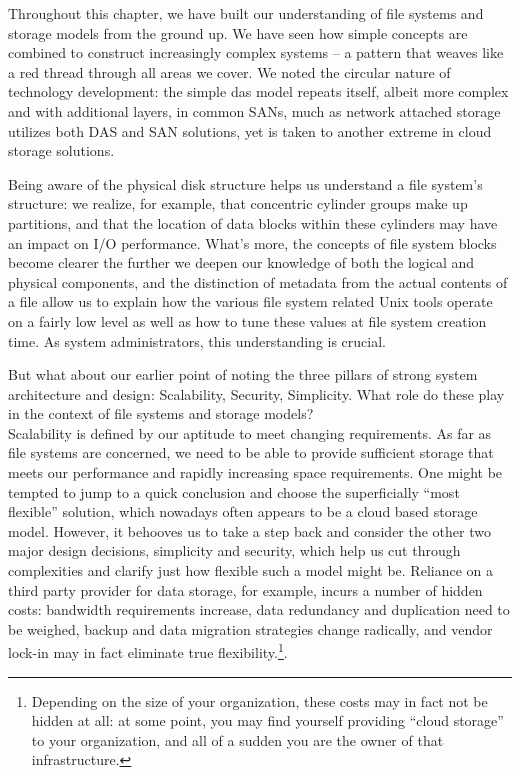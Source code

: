 Throughout this chapter, we have built our
understanding of file systems and storage models from
the ground up.  We have seen how simple concepts are
combined to construct increasingly complex systems --
a pattern that weaves like a red thread through all
areas we cover.  We noted the circular nature of
technology development: the simple \gls{das} model
repeats itself, albeit more complex and with
additional layers, in common SANs, much as network
attached storage utilizes both DAS and SAN solutions,
yet is taken to another extreme in cloud storage
solutions.

Being aware of the physical disk structure helps us
understand a file system's structure: we realize, for
example, that concentric cylinder groups make up
partitions, and that the location of data blocks
within these cylinders may have an impact on I/O
performance.  What's more, the concepts of file system
blocks become clearer the further we deepen our
knowledge of both the logical and physical components,
and the distinction of metadata from the actual
contents of a file allow us to explain how the various
file system related Unix tools operate on a fairly low
level as well as how to tune these values at file
system creation time.  As system administrators, this
understanding is crucial.

But what about our earlier point of noting the three
pillars of strong system architecture and design:
Scalability, Security, Simplicity.  What role do these
play in the context of file systems and storage
models? \\

Scalability is defined by our aptitude to meet
changing requirements.  As far as file systems are
concerned, we need to be able to provide sufficient
storage that meets our performance and rapidly
increasing space requirements.  One might be tempted
to jump to a quick conclusion and choose the
superficially ``most flexible'' solution, which
nowadays often appears to be a cloud based storage
model.  However, it behooves us to take a step back
and consider the other two major design decisions,
simplicity and security, which help us cut through
complexities and clarify just how flexible such a
model might be.  Reliance on a third party provider
for data storage, for example, incurs a number of
hidden costs: bandwidth requirements increase, data
redundancy and duplication need to be weighed, backup
and data migration strategies change radically, and
vendor lock-in may in fact eliminate true
flexibility.\footnote{Depending on the size of your
organization, these costs may in fact not be hidden
at all: at some point, you may find yourself providing
``cloud storage'' to your organization, and all of a
sudden you are the owner of that infrastructure.}.

